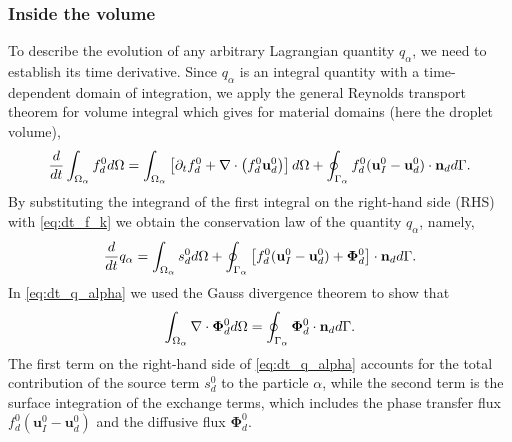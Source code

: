 \subsubsection{Inside the volume}
To describe the evolution of any arbitrary Lagrangian quantity $q_\alpha$, we need to establish its time derivative.
Since $q_\alpha$ is an integral quantity with a time-dependent domain of integration, we apply the general Reynolds transport theorem for volume integral which gives for material domains (here the droplet volume),
\begin{equation}
    \frac{d}{dt}  \int_{\Omega_\alpha} f_d^0 d\Omega
    = \int_{\Omega_\alpha} \left[ \partial_t f_d^0 + \mathbf{\nabla}\cdot\left(f_d^0\textbf{u}_d^0\right) \right] d\Omega\\
    + \oint_{\Gamma_\alpha}  f_d^0 (\textbf{u}_I^0-\textbf{u}_d^0)\cdot \textbf{n}_d  d\Gamma.
    \label{eq:reynolds_transport}
\end{equation}
By substituting the integrand of the first integral on the right-hand side (RHS) with \ref{eq:dt_f_k} we obtain the conservation law of the quantity $q_\alpha$, namely,  
\begin{equation}
    \frac{d}{dt}{q_\alpha}
    = \int_{\Omega_\alpha}  s_d^0  d\Omega
    + \oint_{\Gamma_\alpha}  \left[
        f_d^0 (\textbf{u}_I^0-\textbf{u}_d^0) 
        + \mathbf{\Phi}_d^0 
        \right] \cdot \textbf{n}_d  d\Gamma.
    \label{eq:dt_q_alpha}
\end{equation}
In \ref{eq:dt_q_alpha} we used the Gauss divergence theorem to show that
\begin{equation}
    \int_{\Omega_\alpha} \mathbf{\nabla}\cdot \mathbf{\Phi}_d^0 d\Omega = \oint_{\Gamma_\alpha} \mathbf{\Phi}_d^0 \cdot \textbf{n}_d d\Gamma.
\end{equation}
The first term on the right-hand side of \ref{eq:dt_q_alpha} accounts for the total contribution of the source term $s_d^0$ to the particle $\alpha$,
while the second term is the surface integration of the exchange terms, which includes the phase transfer flux $f_d^0 (\textbf{u}_I^0-\textbf{u}_d^0)$ and the diffusive flux $\mathbf{\Phi}_d^0$. 


